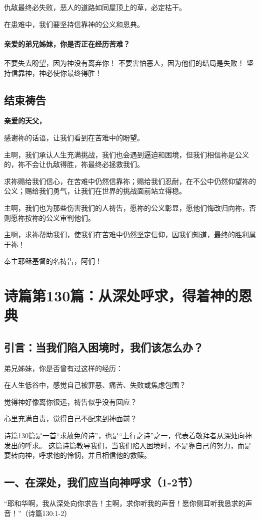 \documentclass[a4paper, 12pt]{article}
\begin{document}
仇敌最终必失败，恶人的道路如同屋顶上的草，必定枯干。

在患难中，我们要坚持信靠神的公义和恩典。

\paragraph*{亲爱的弟兄姊妹，你是否正在经历苦难？}

不要失去盼望，因为神没有离弃你！
不要害怕恶人，因为他们的结局是失败！
坚持信靠神，神必使你最终得胜！
\subsection*{结束祷告}
\textbf{亲爱的天父，}

感谢祢的话语，让我们看到在苦难中的盼望。

主啊，我们承认人生充满挑战，我们也会遇到逼迫和困境，但我们相信祢是公义的，祢不会让仇敌得胜，祢最终必拯救我们。

求祢赐给我们信心，在苦难中仍然信靠祢；赐给我们忍耐，在不公中仍然仰望祢的公义；赐给我们勇气，让我们在世界的挑战面前站立得稳。

主啊，我们也为那些伤害我们的人祷告，愿祢的公义彰显，愿他们悔改归向祢，否则愿祢按祢的公义审判他们。

主啊，求祢帮助我们，使我们在苦难中仍然坚定信仰，因我们知道，最终的胜利属于祢！

奉主耶稣基督的名祷告，阿们！
\newpage
\section{诗篇第130篇：从深处呼求，得着神的恩典}
\subsection*{引言：当我们陷入困境时，我们该怎么办？}
弟兄姊妹，你是否曾有过这样的经历：

在人生低谷中，感觉自己被罪恶、痛苦、失败或焦虑包围？

觉得神好像离你很远，祷告似乎没有回应？

心里充满自责，觉得自己不配来到神面前？

诗篇130篇是一首“求赦免的诗”，也是“上行之诗”之一，代表着敬拜者从深处向神发出的呼求。 这篇诗篇教导我们，当我们陷入困境时，不是靠自己的努力，而是要转向神，呼求他的怜悯，并且相信他的救赎。

\subsection*{一、在深处，我们应当向神呼求（1-2节）}
“耶和华啊，我从深处向你求告！主啊，求你听我的声音！愿你侧耳听我恳求的声音！”（诗篇130:1-2）
\end{document}
